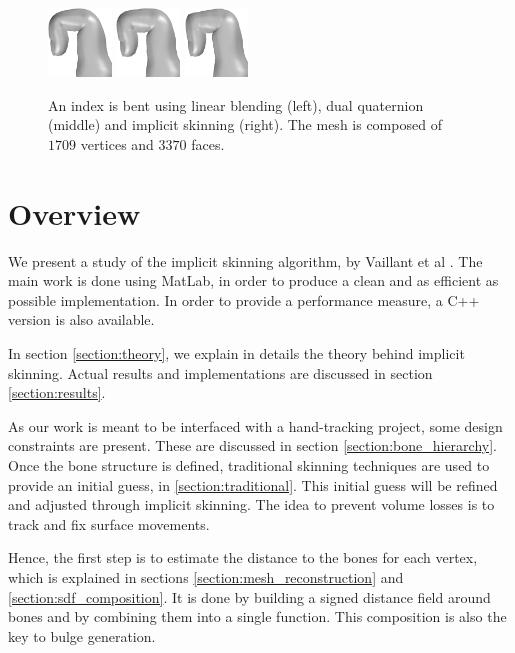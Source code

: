 \documentclass[a4paper,10pt]{article}
\begin{document}
\begin{multicols}{2}
\begin{figure}[H]
\centering
\includegraphics[width=0.15\textwidth]{figs/index_linear}
\includegraphics[width=0.15\textwidth]{figs/index_dualquat}
\includegraphics[width=0.15\textwidth]{figs/index_implicit_hrbf}
\caption{An index is bent using linear blending (left), dual quaternion (middle) and implicit skinning (right).
The mesh is composed of $1709$ vertices and $3370$ faces.}
\label{fig:compare_skinning}
\end{figure}


\section{Overview}

We present a study of the implicit skinning algorithm, by Vaillant et al \cite{Vaillant:2013}.
The main work is done using MatLab, in order to produce a clean and as efficient as possible implementation.
In order to provide a performance measure, a C++ version is also available.

In section \ref{section:theory}, we explain in details the theory behind implicit skinning.
Actual results and implementations are discussed in section \ref{section:results}.

As our work is meant to be interfaced with a hand-tracking project, some design constraints are present.
These are discussed in section \ref{section:bone_hierarchy}.
Once the bone structure is defined, traditional skinning techniques are used to provide an initial guess, in \ref{section:traditional}.
This initial guess will be refined and adjusted through implicit skinning.
The idea to prevent volume losses is to track and fix surface movements.

Hence, the first step is to estimate the distance to the bones for each vertex, which is explained in sections \ref{section:mesh_reconstruction} and \ref{section:sdf_composition}.
It is done by building a signed distance field around bones and by combining them into a single function.
This composition is also the key to bulge generation.


\end{multicols}
\end{document}
